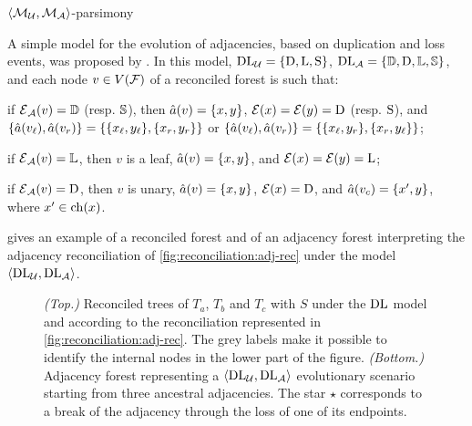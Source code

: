 \begin{problem}{\(\left\langle\mathcal{M}\mathcal{_U}, \mathcal{M}\mathcal{_A}\right\rangle\)-parsimony}
\end{problem}

A simple model for the evolution of adjacencies, based on duplication and loss events, was proposed by \textcite{Berard2012EvolutionGeneNeighborhoods}.
In this model, \(\mathrm{D}\mathrm{L}\mathcal{_U} = \{\mathrm{D}, \mathrm{L}, \mathrm{S}\}\), \(\mathrm{D}\mathrm{L}\mathcal{_A} = \{\mathbb{D}, \mathrm{D}, \mathbb{L}, \mathbb{S}\}\), and each node \(v \in V(\mathcal{F})\) of a reconciled forest is such that:
\begin{compactitemize}
    \item if \(\mathcal{E}\mathcal{_A}(v) = \mathbb{D}\) (resp. \(\mathbb{S}\)), then
        \(\hat{a}(v) = \{x, y\}\),
        \(\mathcal{E}(x) = \mathcal{E}(y) = \mathrm{D}\) (resp. \(\mathrm{S}\)), and
        \(\{\hat{a}(v_\mathit{\ell}), \hat{a}(v_r)\} = \{\{x_\mathit{\ell}, y_\mathit{\ell}\}, \{x_r, y_r\}\}\)
        or \(\{\hat{a}(v_\mathit{\ell}), \hat{a}(v_r)\} = \{\{x_\mathit{\ell}, y_r\}, \{x_r, y_\mathit{\ell}\}\}\);
    \item if \(\mathcal{E}\mathcal{_A}(v) = \mathbb{L}\), then \(v\) is a leaf,
        \(\hat{a}(v) = \{x, y\}\),
        and \(\mathcal{E}(x) = \mathcal{E}(y) = \mathrm{L}\);
    \item if \(\mathcal{E}\mathcal{_A}(v) = \mathrm{D}\), then \(v\) is unary,
        \(\hat{a}(v) = \{x, y\}\),
        \(\mathcal{E}(x) = \mathrm{D}\),
        and \(\hat{a}(v_c) = \{x', y\}\),
        where \(x' \in \mathrm{ch}(x)\).
\end{compactitemize}

 gives an example of a reconciled forest and of an adjacency forest interpreting the adjacency reconciliation of \cref{fig:reconciliation:adj-rec} under the model \(\left\langle\mathrm{D}\mathrm{L}\mathcal{_U}, \mathrm{D}\mathrm{L}\mathcal{_A}\right\rangle\).

\begin{figure}[htb]
    \capstart
    \centering
    
    \caption[Interpretation of an adjacency reconciliation]{
        \emph{(Top.)}
        Reconciled trees of \(T_a\), \(T_b\) and \(T_c\) with \(S\)
        under the \(\mathrm{D}\mathrm{L}\) model
        and according to the reconciliation represented in \cref{fig:reconciliation:adj-rec}.
        The grey labels make it possible to identify the internal nodes in the lower part of the figure.
        \emph{(Bottom.)}
        Adjacency forest representing a \(\left\langle\mathrm{D}\mathrm{L}\mathcal{_U}, \mathrm{D}\mathrm{L}\mathcal{_A}\right\rangle\) evolutionary scenario starting from three ancestral adjacencies.
        The star \(\star\) corresponds to a break of the adjacency through the loss of one of its endpoints.
    }
    \label{fig:reconciliation:adj-forest}
\end{figure}

